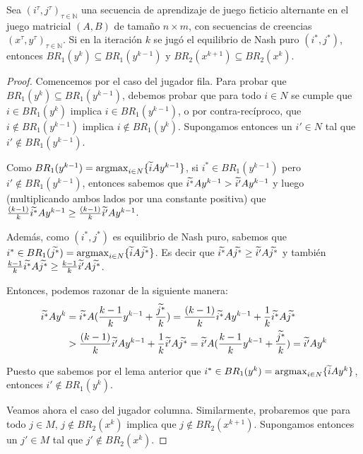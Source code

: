 \begin{lemma}
    Sea $(i^\tau, j^\tau)_{\tau \in \mathbb{N}}$ una secuencia de aprendizaje de juego ficticio alternante en el juego matricial $(A, B)$ de tamaño $n \times m$, con secuencias de creencias $(x^\tau, y^\tau)_{\tau \in \mathbb{N}}$. Si en la iteración $k$ se jugó el equilibrio de Nash puro $(i^*, j^*)$, entonces $BR_1(y^{k}) \subseteq BR_1(y^{k-1})$ y $BR_2(x^{k+1}) \subseteq BR_2(x^{k})$.
\end{lemma}
\begin{proof}
    Comencemos por el caso del jugador fila. Para probar que $BR_1(y^{k}) \subseteq BR_1(y^{k-1})$, debemos probar que para todo $i \in N$ se cumple que $i \in BR_1(y^{k})$ implica $i \in BR_1(y^{k-1})$, o por contra-recíproco, que $i \notin BR_1(y^{k-1})$ implica $i \notin BR_1(y^{k})$. Supongamos entonces un $i' \in N$ tal que $i' \notin BR_1(y^{k-1})$.

    Como $BR_1(y^{k-1}) = \operatorname*{argmax}_{i \in N} \{\widetilde{i}Ay^{k-1}\}$, si $i^* \in BR_1(y^{k-1})$ pero $i' \notin BR_1(y^{k-1})$, entonces sabemos que $\widetilde{i^*}Ay^{k-1} > \widetilde{i'}Ay^{k-1}$ y luego (multiplicando ambos lados por una constante positiva) que $\frac{(k - 1)}{k} \widetilde{i^*}Ay^{k-1} \geq \frac{(k - 1)}{k} \widetilde{i'}Ay^{k-1}$.
    
    Además, como $(i^*, j^*)$ es equilibrio de Nash puro, sabemos que $i^* \in BR_1(\widetilde{j^*}) = \operatorname*{argmax}_{i \in N} \{\widetilde{i}A\widetilde{j^*}\}$. Es decir que $\widetilde{i^*}A\widetilde{j^*} \ge \widetilde{i'}A\widetilde{j^*}$ y también $\frac{k - 1}{k} \widetilde{i^*}A\widetilde{j^*} \ge \frac{k - 1}{k} \widetilde{i'}A\widetilde{j^*}$.

    Entonces, podemos razonar de la siguiente manera:
    \begin{align*}
        \widetilde{i^*}Ay^k &= \widetilde{i^*}A(\frac{k - 1}{k} y^{k-1} + \frac{\widetilde{j^*}}{k}) = \frac{(k - 1)}{k} \widetilde{i^*}Ay^{k-1} + \frac{1}{k}\widetilde{i^*}A\widetilde{j^*}\\
        &> \frac{(k - 1)}{k} \widetilde{i'}Ay^{k-1} + \frac{1}{k}\widetilde{i'}A\widetilde{j^*} = \widetilde{i'}A(\frac{k - 1}{k} y^{k-1} + \frac{\widetilde{j^*}}{k}) = \widetilde{i'}Ay^k
    \end{align*}

    Puesto que sabemos por el lema anterior que $i^* \in BR_1(y^{k}) = \operatorname*{argmax}_{i \in N} \{\widetilde{i}Ay^{k}\}$, entonces $i' \notin BR_1(y^{k})$.
    
    Veamos ahora el caso del jugador columna. Similarmente, probaremos que para todo $j \in M$, $ j \notin BR_2(x^k)$ implica que $j \notin BR_2(x^{k+1})$. Supongamos entonces un $j' \in M$ tal que $j' \notin BR_2(x^k)$.


\end{proof}
